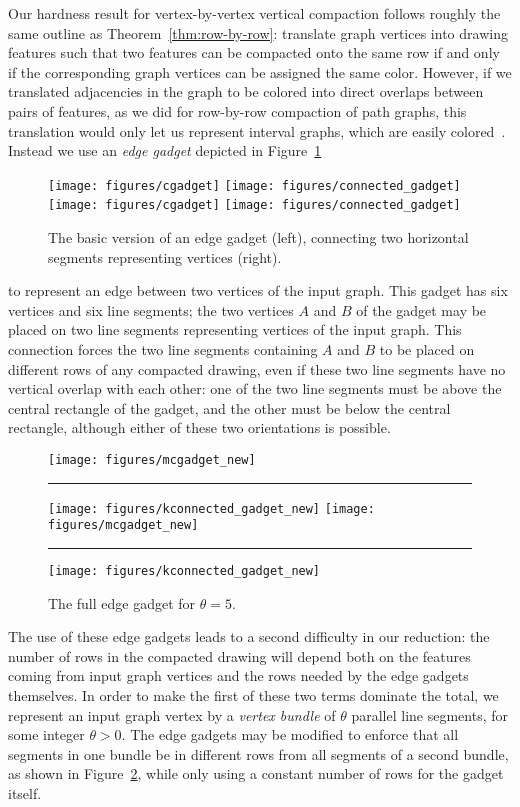 \documentclass[12pt]{article}
\theoremstyle{definitions}
\begin{document}
Our hardness result for vertex-by-vertex vertical compaction follows roughly the same outline as Theorem~\ref{thm:row-by-row}: translate graph vertices into drawing features such that two features  can be compacted onto the same row if and only if the corresponding graph vertices can be assigned the same color. However, if we translated adjacencies in the graph to be colored into direct overlaps between pairs of features, as we did for row-by-row compaction of path graphs, this translation would only let us represent interval graphs, which are easily colored~\cite{Olariu:1991}. Instead we use an \emph{edge gadget} depicted in Figure~\ref{fig:edge-gadget}
\begin{figure}[b]
\centering
\ifFull
\texttt{[image: figures/cgadget]}\qquad
\texttt{[image: figures/connected\_gadget]}
\else
\texttt{[image: figures/cgadget]}\qquad
\texttt{[image: figures/connected\_gadget]}
\fi
\caption{The basic version of an edge gadget (left), connecting two horizontal segments representing vertices (right).}
\label{fig:edge-gadget}
\end{figure}
to represent an edge between two vertices of the
input graph. This gadget has six vertices and six line segments; the two vertices $A$ and $B$ of the gadget may be placed on two line segments representing vertices of the input graph. This connection forces the two line segments containing $A$ and $B$ to be placed on different rows of any compacted drawing, even if these two line segments have no vertical overlap with each other: one of the two line segments must be above the central rectangle of the gadget, and the other must be below the central rectangle, although either of these two orientations is possible.

\begin{figure}[b]
\centering
\ifFull
\texttt{[image: figures/mcgadget\_new]}\rule{2em}{0em}
\texttt{[image: figures/kconnected\_gadget\_new]}
\else
\texttt{[image: figures/mcgadget\_new]}\rule{2em}{0em}
\texttt{[image: figures/kconnected\_gadget\_new]}
\fi
\caption{The full edge gadget for $\theta=5$.}
\label{fig:bundle-gadget}
\end{figure}

The use of these edge gadgets leads to a second difficulty in our reduction: the number of rows in the compacted drawing will depend both on the features coming from input graph vertices and the rows needed by the edge gadgets themselves. In order to make the first of these two terms dominate the total, we represent an input graph vertex by a \emph{vertex bundle} of $\theta$ parallel line segments, for some integer $\theta>0$. The edge gadgets may be modified to enforce that all segments in one bundle be in different rows from all segments of a second bundle, as shown in Figure~\ref{fig:bundle-gadget}, while only using a constant number of rows for the gadget itself.
\end{document}
